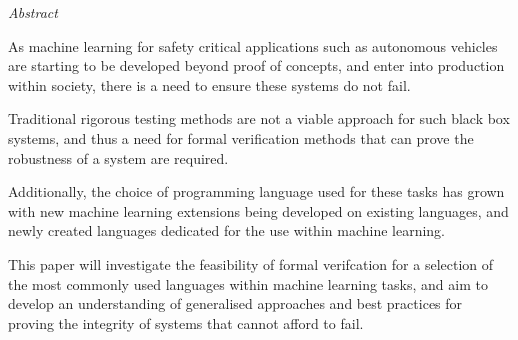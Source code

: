 \documentclass[11pt, oneside]{Thesis} %
\begin{document}
{\huge{\textit{Abstract}} \par}{ 

    As machine learning for safety critical applications such as autonomous vehicles are starting to be developed beyond proof of concepts, and enter into 
    production within society, there is a need to ensure these systems do not fail.

    Traditional rigorous testing methods are not a viable approach for such black box systems, and thus a need for formal verification methods that can 
    prove the robustness of a system are required.

    Additionally, the choice of programming language used for these tasks has grown with new machine learning extensions being developed on existing languages, and 
    newly created languages dedicated for the use within machine learning.

    This paper will investigate the feasibility of formal verifcation for a selection of the most commonly used languages within machine learning tasks, and aim to develop an understanding 
    of generalised approaches and best practices for proving the integrity of systems that cannot afford to fail. 


    \clearpage %



    \clearpage %


    \pagestyle{fancy} %

}
\end{document}

